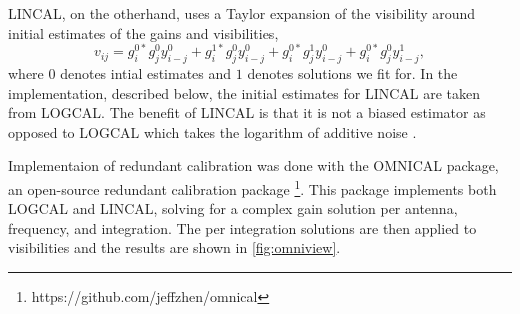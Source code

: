 \documentclass[twocolumn,numberedappendix]{emulateapj} \shorttitle{PSA64}
\begin{document}
LINCAL, on the otherhand, uses a Taylor expansion of the visibility around initial
estimates of the gains and visibilities, 
\begin{equation}\label{eqn:lincal}
v_{ij} = g_{i}^{0*}g_{j}^{0}y_{i-j}^{0} + g_{i}^{1*}g_{j}^{0}y_{i-j}^{0} +
         g_{i}^{0*}g_{j}^{1}y_{i-j}^{0}+g_{i}^{0*}g_{j}^{0}y_{i-j}^{1},
\end{equation}
where $0$ denotes intial estimates and $1$ denotes 
solutions we fit for. In the implementation, described below, the initial
estimates for LINCAL are taken from LOGCAL. The benefit of
LINCAL is that it is not a biased estimator as opposed to LOGCAL which takes the
logarithm of additive noise \citep{liu_et_al2010}.

%    
%       

Implementaion of redundant calibration was done with the OMNICAL package, an
open-source redundant calibration package
\footnote{https://github.com/jeffzhen/omnical}\citep{zheng_et_al2014}. This
package implements both LOGCAL and LINCAL, solving for a complex gain solution
per antenna, frequency, and integration. The per integration solutions are then
applied to visibilities and the results are shown in \ref{fig:omniview}.
\end{document}
